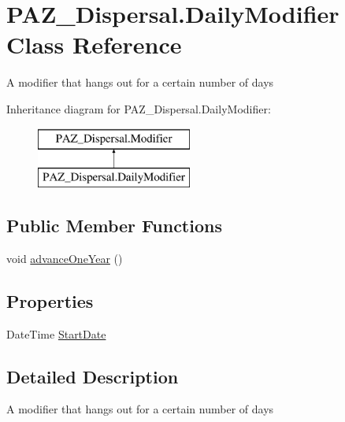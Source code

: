 \hypertarget{class_p_a_z___dispersal_1_1_daily_modifier}{\section{P\-A\-Z\-\_\-\-Dispersal.\-Daily\-Modifier Class Reference}
\label{class_p_a_z___dispersal_1_1_daily_modifier}
}


A modifier that hangs out for a certain number of days  


Inheritance diagram for P\-A\-Z\-\_\-\-Dispersal.\-Daily\-Modifier\-:\begin{figure}[H]
\begin{center}
\leavevmode
\includegraphics[height=2.000000cm]{class_p_a_z___dispersal_1_1_daily_modifier}
\end{center}
\end{figure}
\subsection*{Public Member Functions}
\begin{DoxyCompactItemize}
\item 
void \hyperlink{class_p_a_z___dispersal_1_1_daily_modifier_ae65c250ce2897aac40e2bb09e202f3b5}{advance\-One\-Year} ()
\end{DoxyCompactItemize}
\subsection*{Properties}
\begin{DoxyCompactItemize}
\item 
Date\-Time \hyperlink{class_p_a_z___dispersal_1_1_daily_modifier_a015040304727cd4a4fd10462881211b4}{Start\-Date}
\end{DoxyCompactItemize}


\subsection{Detailed Description}
A modifier that hangs out for a certain number of days 



